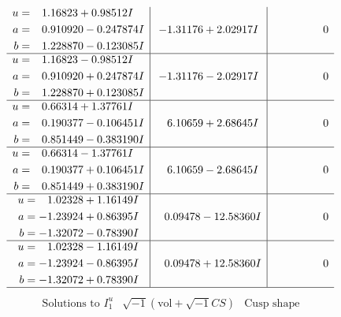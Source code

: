 \documentclass[1p]{elsarticle_modified}
\theoremstyle{definition}
\newcommand{\I}{\sqrt{-1}}
\begin{document}
$$\begin{array}{c|c|c}
\begin{aligned}
u &= \phantom{-}1.16823 + 0.98512 I \\
a &= \phantom{-}0.910920 - 0.247874 I \\
b &= \phantom{-}1.228870 - 0.123085 I\end{aligned}
 & -1.31176 + 2.02917 I & \phantom{-0.000000 } 0 \\ \hline\begin{aligned}
u &= \phantom{-}1.16823 - 0.98512 I \\
a &= \phantom{-}0.910920 + 0.247874 I \\
b &= \phantom{-}1.228870 + 0.123085 I\end{aligned}
 & -1.31176 - 2.02917 I & \phantom{-0.000000 } 0 \\ \hline\begin{aligned}
u &= \phantom{-}0.66314 + 1.37761 I \\
a &= \phantom{-}0.190377 - 0.106451 I \\
b &= \phantom{-}0.851449 - 0.383190 I\end{aligned}
 & \phantom{-}6.10659 + 2.68645 I & \phantom{-0.000000 } 0 \\ \hline\begin{aligned}
u &= \phantom{-}0.66314 - 1.37761 I \\
a &= \phantom{-}0.190377 + 0.106451 I \\
b &= \phantom{-}0.851449 + 0.383190 I\end{aligned}
 & \phantom{-}6.10659 - 2.68645 I & \phantom{-0.000000 } 0 \\ \hline\begin{aligned}
u &= \phantom{-}1.02328 + 1.16149 I \\
a &= -1.23924 + 0.86395 I \\
b &= -1.32072 - 0.78390 I\end{aligned}
 & \phantom{-}0.09478 - 12.58360 I & \phantom{-0.000000 } 0 \\ \hline\begin{aligned}
u &= \phantom{-}1.02328 - 1.16149 I \\
a &= -1.23924 - 0.86395 I \\
b &= -1.32072 + 0.78390 I\end{aligned}
 & \phantom{-}0.09478 + 12.58360 I & \phantom{-0.000000 } 0\\
 \hline 
 \end{array}$$\newpage$$\begin{array}{c|c|c}  
\text{Solutions to }I^u_{1}& \I (\text{vol} + \sqrt{-1}CS) & \text{Cusp shape}\\

\end{array}$$
\end{document}
